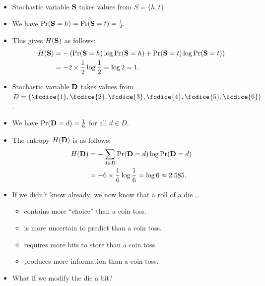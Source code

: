 \begin{frame}
  \begin{example}
    \begin{itemize}
      \item Stochastic variable \(\mathbf{S}\) takes values from \(S = \{h, 
          t\}\).
      \item We have \(\Pr(\mathbf S = h) = \Pr(\mathbf S = t) = \frac{1}{2}.\)
      \item This gives \(H(\mathbf S)\) as follows:
        \begin{align*}
          H(\mathbf S) &= -\left( \Pr(\mathbf S = h)\log \Pr(\mathbf S = h) 
            + \Pr(\mathbf S = t) \log \Pr(\mathbf S = t) \right) \\
          &= -2\times \frac{1}{2}\log \frac{1}{2} = \log 2 = 1.
        \end{align*}
    \end{itemize}
  \end{example}
\end{frame}

\begin{frame}
  \begin{example}
    \begin{itemize}
      \item Stochastic variable \(\mathbf D\) takes values from \(D 
          = \{\fcdice{1}, \fcdice{2}, \fcdice{3}, \fcdice{4}, \fcdice{5}, 
          \fcdice{6}\}\).
      \item We have \(\Pr(\mathbf D = d) = \frac{1}{6}\) for all \(d\in D\).
      \item The entropy \(H(\mathbf D)\) is as follows:
        \begin{align*}
          H(\mathbf D) &= -\sum_{d\in D} \Pr(\mathbf D = d)\log\Pr(\mathbf D = d) \\
          &= -6\times \frac{1}{6}\log\frac{1}{6} = \log 6 \approx 2.585.
        \end{align*}
    \end{itemize}
  \end{example}
\end{frame}

\begin{frame}
  \begin{remark}
    \begin{itemize}
      \item If we didn't know already, we now know that a roll of a die \dots
        \begin{itemize}
          \item contains more \enquote{choice} than a coin toss.
          \item is more uncertain to predict than a coin toss.
          \item requires more bits to store than a coin toss.
          \item produces more information than a coin toss.
        \end{itemize}

      \item What if we modify the die a bit?
    \end{itemize}
  \end{remark}
\end{frame}


